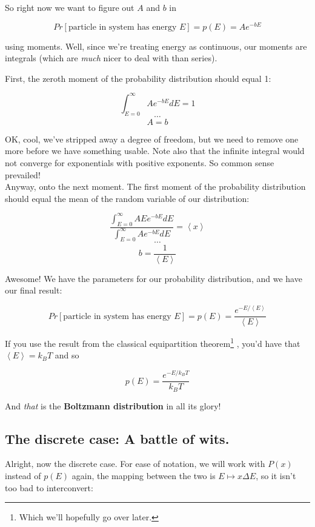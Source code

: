 \documentclass[letterpaper,12pt]{report}
\begin{document}
So right now we want to figure out \(A\) and \(b\) in

\[Pr[\text{particle in system has energy }E] = p(E) = Ae^{-bE}\]

using moments. Well, since we're treating energy as continuous, our moments
are integrals (which are \emph{much} nicer to deal with than series).

First, the zeroth moment of the probability distribution should equal 1:
 
\[\int_{E=0}^{\infty} Ae^{-bE}dE = 1 \]
\[  \cdots \]
\[  A = b \] 

OK, cool, we've stripped away a degree of freedom, but we need to remove one more
before we have something usable. Note also that the infinite integral would not converge
for exponentials with positive exponents. So common sense prevailed!
\\
Anyway, onto the next moment. The first moment of the probability distribution
should equal the mean of the random variable of our distribution:

\[\frac{\int_{E=0}^{\infty} AEe^{-bE}dE} {\int_{E=0}^{\infty} Ae^{-bE}dE} = \left<x\right> \]
\[  \cdots \]
\[  b = \frac{1}{\left<E\right>} \]

Awesome! We have the parameters for our probability distribution, and we have our final result:

\[Pr[\text{particle in system has energy }E] 
        = p(E) = \frac{e^{-E/\left<E\right>}}{\left<E\right>}
\]


If you use the result from the classical equipartition theorem\footnote{
  Which we'll hopefully go over later.
}
, you'd have that
\(\left<E\right> = k_BT\) and so 

\[p(E) = \frac{e^{-E/k_BT}}{k_BT}\]

And \emph{that} is the \textbf{Boltzmann distribution}
in all its glory!

\subsection{The discrete case: A battle of wits.}

Alright, now the discrete case. For ease of notation, we will work with \(P(x)\) instead of
\(p(E)\) \textemdash{} again, the mapping between the two is \(E \mapsto x\Delta E\), so it
isn't too bad to interconvert:
\end{document}
